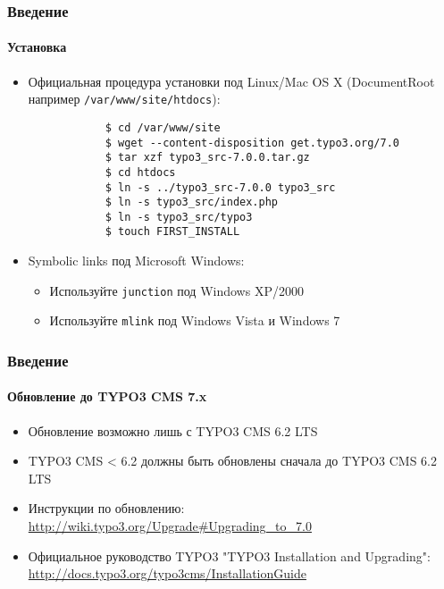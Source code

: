 \begin{frame}[fragile]
	\frametitle{Введение}
	\framesubtitle{Установка}

	\begin{itemize}
		\item Официальная процедура установки под Linux/Mac OS X\newline
			(DocumentRoot например \texttt{/var/www/site/htdocs}):
		\begin{lstlisting}
			$ cd /var/www/site
			$ wget --content-disposition get.typo3.org/7.0
			$ tar xzf typo3_src-7.0.0.tar.gz
			$ cd htdocs
			$ ln -s ../typo3_src-7.0.0 typo3_src
			$ ln -s typo3_src/index.php
			$ ln -s typo3_src/typo3
			$ touch FIRST_INSTALL
		\end{lstlisting}

		\item Symbolic links под Microsoft Windows:

			\begin{itemize}
				\item Используйте \texttt{junction} под Windows XP/2000
				\item Используйте \texttt{mlink} под Windows Vista и Windows 7
			\end{itemize}

	\end{itemize}
\end{frame}


\begin{frame}[fragile]
	\frametitle{Введение}
	\framesubtitle{Обновление до TYPO3 CMS 7.x}

	\begin{itemize}
		\item Обновление возможно лишь с TYPO3 CMS 6.2 LTS
		\item TYPO3 CMS < 6.2 должны быть обновлены сначала до TYPO3 CMS 6.2 LTS
	\end{itemize}

	\begin{itemize}

		\item Инструкции по обновлению:\newline
			\smaller\url{http://wiki.typo3.org/Upgrade#Upgrading_to_7.0}\normalsize
		\item Официальное руководство TYPO3 "TYPO3 Installation and Upgrading":
			\smaller\url{http://docs.typo3.org/typo3cms/InstallationGuide}\normalsize
	\end{itemize}

\end{frame}

